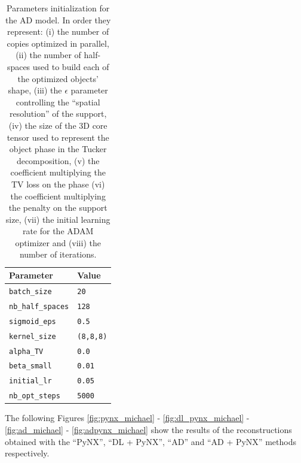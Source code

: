 \begin{table}[H] 

  \centering
  {%
    \begin{tabular}{|l|l|}
      \hline
      \textbf{Parameter} & \textbf{Value} \\
      \hline 
      \texttt{batch\_size}                      & \texttt{20} \\
      \texttt{nb\_half\_spaces}                  & \texttt{128} \\
      \texttt{sigmoid\_eps}                     & \texttt{0.5} \\
      \texttt{kernel\_size}                     & \texttt{(8,8,8)} \\
      \texttt{alpha\_TV}                        & \texttt{0.0} \\
      \texttt{beta\_small}                      & \texttt{0.01} \\
      \texttt{initial\_lr}                      & \texttt{0.05} \\
      \texttt{nb\_opt\_steps}                   & \texttt{5000} \\

      \hline
    \end{tabular}%
  } 
  \caption{Parameters initialization for the AD model. In order they represent: (i) the number of copies optimized in 
  parallel, (ii) the number of half-spaces used to build each of the optimized objects' shape, (iii) the $\epsilon$ parameter 
  controlling the ``spatial resolution'' of the support, (iv) the size of the 3D core tensor used to represent the object 
  phase in the Tucker decomposition, (v) the coefficient multiplying the TV loss on the phase (vi) the coefficient multiplying 
  the penalty on the support size, (vii) the initial learning rate for the ADAM optimizer and (viii) the number of iterations.}
  \label{table:AD}
\end{table}


The following Figures \ref{fig:pynx_michael} - \ref{fig:dl_pynx_michael} - \ref{fig:ad_michael} - \ref{fig:adpynx_michael} show the results 
of the reconstructions obtained with the ``PyNX'', ``DL + PyNX'', ``AD'' and ``AD + PyNX'' methods respectively. 


